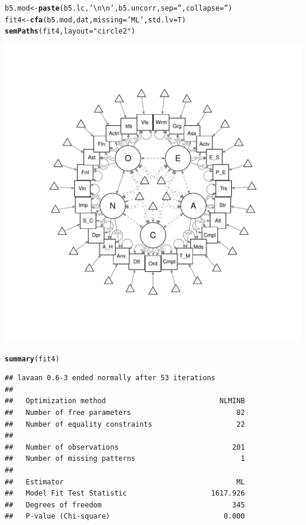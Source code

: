 \documentclass{article}\usepackage[]{graphicx}\usepackage[]{color}
\makeatletter
\def\maxwidth{ %
  \ifdim\Gin@nat@width>\linewidth
    \linewidth
  \else
    \Gin@nat@width
  \fi
}
\newcommand{\hlstr}[1]{\textcolor[rgb]{0.192,0.494,0.8}{#1}}%
\newcommand{\hlstd}[1]{\textcolor[rgb]{0.345,0.345,0.345}{#1}}%
\newcommand{\hlkwb}[1]{\textcolor[rgb]{0.69,0.353,0.396}{#1}}%
\newcommand{\hlkwc}[1]{\textcolor[rgb]{0.333,0.667,0.333}{#1}}%
\newcommand{\hlkwd}[1]{\textcolor[rgb]{0.737,0.353,0.396}{\textbf{#1}}}%
\newenvironment{kframe}{%
 \def\at@end@of@kframe{}%
 \ifinner\ifhmode%
  \def\at@end@of@kframe{\end{minipage}}%
  \begin{minipage}{\columnwidth}%
 \fi\fi%
 \def\FrameCommand##1{\hskip\@totalleftmargin \hskip-\fboxsep
 \colorbox{shadecolor}{##1}\hskip-\fboxsep
     \hskip-\linewidth \hskip-\@totalleftmargin \hskip\columnwidth}%
 \MakeFramed {\advance\hsize-\width
   \@totalleftmargin\z@ \linewidth\hsize
   \@setminipage}}%
 {\par\unskip\endMakeFramed%
 \at@end@of@kframe}
\newenvironment{knitrout}{}{} %
\makeatother
\begin{document}
\begin{knitrout}
\begin{kframe}
\begin{alltt}
\hlstd{b5.mod} \hlkwb{<-} \hlkwd{paste}\hlstd{(b5.lc,} \hlstr{'\textbackslash{}n\textbackslash{}n'}\hlstd{, b5.uncorr,} \hlkwc{sep} \hlstd{=} \hlstr{''}\hlstd{,} \hlkwc{collapse} \hlstd{=} \hlstr{''}\hlstd{)}
\hlstd{fit4} \hlkwb{<-} \hlkwd{cfa}\hlstd{(b5.mod, dat,} \hlkwc{missing} \hlstd{=} \hlstr{'ML'}\hlstd{,} \hlkwc{std.lv} \hlstd{= T)}
\hlkwd{semPaths}\hlstd{(fit4,} \hlkwc{layout} \hlstd{=} \hlstr{"circle2"}\hlstd{)}
\end{alltt}
\end{kframe}
\includegraphics[width=\maxwidth]{figure/unnamed-chunk-11-1} 
\begin{kframe}\begin{alltt}
\hlkwd{summary}\hlstd{(fit4)}
\end{alltt}
\begin{verbatim}
## lavaan 0.6-3 ended normally after 53 iterations
## 
##   Optimization method                           NLMINB
##   Number of free parameters                         82
##   Number of equality constraints                    22
## 
##   Number of observations                           201
##   Number of missing patterns                         1
## 
##   Estimator                                         ML
##   Model Fit Test Statistic                    1617.926
##   Degrees of freedom                               345
##   P-value (Chi-square)                           0.000

\end{verbatim}
\end{kframe}
\end{knitrout}
\end{document}
